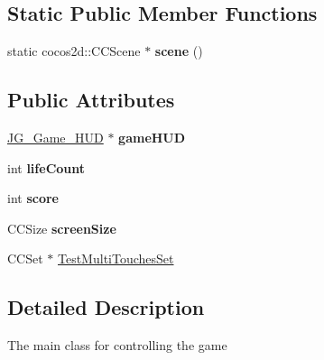 \begin{DoxyCompactItemize}
\end{DoxyCompactItemize}
\subsection*{Static Public Member Functions}
\begin{DoxyCompactItemize}
\item 
\hypertarget{class_j_g___game___main_ad8df9f7dc524c5e4096ba72ca3d225a0}{static cocos2d\-::\-C\-C\-Scene $\ast$ {\bfseries scene} ()}\label{class_j_g___game___main_ad8df9f7dc524c5e4096ba72ca3d225a0}

\end{DoxyCompactItemize}
\subsection*{Public Attributes}
\begin{DoxyCompactItemize}
\item 
\hypertarget{class_j_g___game___main_a3312f494aeb62375e2ba54cfc2e7b4f9}{\hyperlink{class_j_g___game___h_u_d}{J\-G\-\_\-\-Game\-\_\-\-H\-U\-D} $\ast$ {\bfseries game\-H\-U\-D}}\label{class_j_g___game___main_a3312f494aeb62375e2ba54cfc2e7b4f9}

\item 
\hypertarget{class_j_g___game___main_a6946a041c2d1e0e1af8f668df4eaef1d}{int {\bfseries life\-Count}}\label{class_j_g___game___main_a6946a041c2d1e0e1af8f668df4eaef1d}

\item 
\hypertarget{class_j_g___game___main_a092aed9f82afd093223436207aaf95ee}{int {\bfseries score}}\label{class_j_g___game___main_a092aed9f82afd093223436207aaf95ee}

\item 
\hypertarget{class_j_g___game___main_a8974bfdd52077060e4561210cabd193f}{C\-C\-Size {\bfseries screen\-Size}}\label{class_j_g___game___main_a8974bfdd52077060e4561210cabd193f}

\item 
C\-C\-Set $\ast$ \hyperlink{class_j_g___game___main_abf4ca18c92688188dcf7bf60c73fa3ae}{Test\-Multi\-Touches\-Set}
\end{DoxyCompactItemize}


\subsection{Detailed Description}
The main class for controlling the game 

